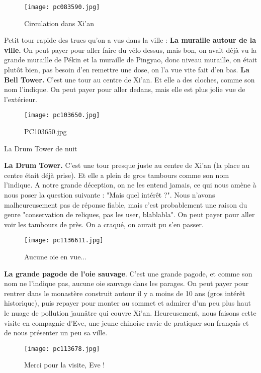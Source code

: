 \documentclass{book}
\begin{document}
\begin{figure}[h]
\centering
\texttt{[image: pc083590.jpg]}
\caption*{Circulation dans Xi'an}
\end{figure}

 Petit tour rapide des trucs qu'on a vus dans la ville :
\textbf{La muraille autour de la ville.} On peut payer pour aller faire du vélo dessus, mais bon, on avait déjà vu la grande muraille de Pékin et la muraille de Pingyao, donc niveau muraille, on était plutôt bien, pas besoin d'en remettre une dose, on l'a vue vite fait d'en bas.
\textbf{ La Bell Tower.} C'est une tour au centre de Xi'an. Et elle a des cloches, comme son nom l'indique. On peut payer pour aller dedans, mais elle est plus jolie vue de l'extérieur.


\begin{figure}[h]
\centering
\texttt{[image: pc103650.jpg]}
\caption*{PC103650.jpg}
\end{figure}La Drum Tower de nuit

\textbf{La Drum Tower.} C'est une tour presque juste au centre de Xi'an (la place au centre était déjà prise). Et elle a plein de gros tambours comme son nom l'indique. A notre grande déception, on ne les entend jamais, ce qui nous amène à nous poser la question suivante : "Mais quel intérêt ?". Nous n'avons malheureusement pas de réponse fiable, mais c'est probablement une raison du genre "conservation de reliques, pas les user, blablabla". On peut payer pour aller voir les tambours de près. On a craqué, on aurait pu s'en passer.


\begin{figure}[h]
\centering
\texttt{[image: pc1136611.jpg]}
\caption*{Aucune oie en vue...}
\end{figure}

\textbf{La grande pagode de l'oie sauvage}. C'est une grande pagode, et comme son nom ne l'indique pas, aucune oie sauvage dans les parages. On peut payer pour rentrer dans le monastère construit autour il y a moins de 10 ans (gros intérêt historique), puis repayer pour monter au sommet et admirer d'un peu plus haut le nuage de pollution jaunâtre qui couvre Xi'an. Heureusement, nous faisons cette visite en compagnie d'Eve, une jeune chinoise ravie de pratiquer son français et de nous présenter un peu sa ville.


\begin{figure}[h]
\centering
\texttt{[image: pc113678.jpg]}
\caption*{Merci pour la visite, Eve !}
\end{figure}
\end{document}
